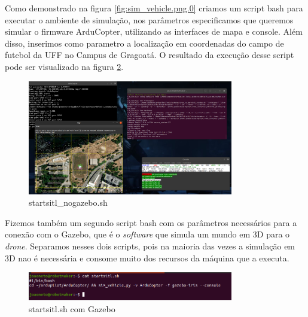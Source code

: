 \documentclass[12pt,a4paper,oneside]{book}
\begin{document}
Como demonstrado na figura \ref{fig:sim_vehicle.png.0} criamos um script bash para executar o ambiente de simulação, nos parâmetros especificamos que queremos simular o firmware ArduCopter, utilizando as interfaces de mapa e console. Além disso, inserimos como parametro a localização em coordenadas do campo de futebol da UFF no Campus de Gragoatá. O resultado da execução desse script pode ser visualizado na figura \ref{fig:startsitl_nogazebo.png.0}.

%
\begin{figure}[H]
  \centering
  \includegraphics[width=0.8\textwidth]{Images/Desenvolvimento/startsitl_nogazebo.png}
  \caption{startsitl\_nogazebo.sh}
  \label{fig:startsitl_nogazebo.png.0}
\end{figure}
%

Fizemos também um segundo script bash com os parâmetros necessários para a conexão com o Gazebo, que é o \textit{software} que simula um mundo em 3D para o \textit{drone}. Separamos nesses dois scripts, pois na maioria das vezes a simulação em 3D nao é necessária e consome muito dos recursos da máquina que a executa.

%
\begin{figure}[H]
  \centering
  \includegraphics[width=0.8\textwidth]{Images/Desenvolvimento/startsitl.sh.png}
  \caption{startsitl.sh com Gazebo}
  \label{fig:startsitl_nogazebo.png.0}
\end{figure}
%
\end{document}
